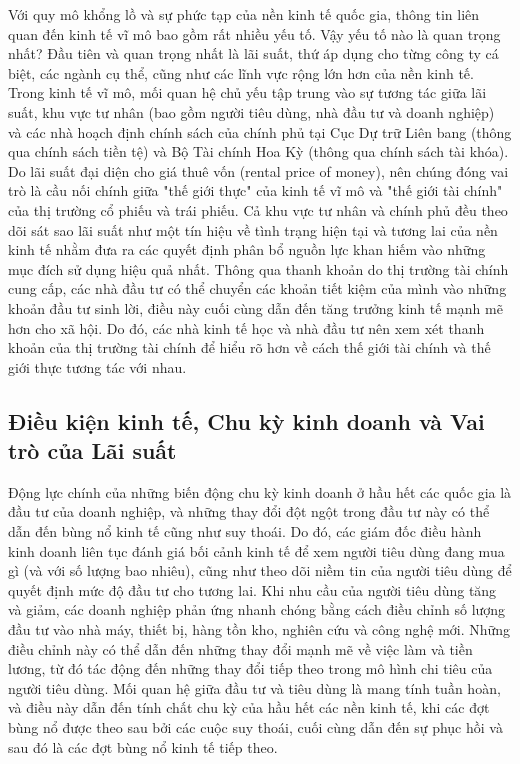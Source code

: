 Với quy mô khổng lồ và sự phức tạp của nền kinh tế quốc gia, thông tin liên quan đến kinh tế vĩ mô bao gồm rất nhiều yếu tố. Vậy yếu tố nào là quan trọng nhất? Đầu tiên và quan trọng nhất là lãi suất, thứ áp dụng cho từng công ty cá biệt, các ngành cụ thể, cũng như các lĩnh vực rộng lớn hơn của nền kinh tế. Trong kinh tế vĩ mô, mối quan hệ chủ yếu tập trung vào sự tương tác giữa lãi suất, khu vực tư nhân (bao gồm người tiêu dùng, nhà đầu tư và doanh nghiệp) và các nhà hoạch định chính sách của chính phủ tại Cục Dự trữ Liên bang (thông qua chính sách tiền tệ) và Bộ Tài chính Hoa Kỳ (thông qua chính sách tài khóa). Do lãi suất đại diện cho giá thuê vốn (rental price of money), nên chúng đóng vai trò là cầu nối chính giữa "thế giới thực" của kinh tế vĩ mô và "thế giới tài chính" của thị trường cổ phiếu và trái phiếu. Cả khu vực tư nhân và chính phủ đều theo dõi sát sao lãi suất như một tín hiệu về tình trạng hiện tại và tương lai của nền kinh tế nhằm đưa ra các quyết định phân bổ nguồn lực khan hiếm vào những mục đích sử dụng hiệu quả nhất. Thông qua thanh khoản do thị trường tài chính cung cấp, các nhà đầu tư có thể chuyển các khoản tiết kiệm của mình vào những khoản đầu tư sinh lời, điều này cuối cùng dẫn đến tăng trưởng kinh tế mạnh mẽ hơn cho xã hội. Do đó, các nhà kinh tế học và nhà đầu tư nên xem xét thanh khoản của thị trường tài chính để hiểu rõ hơn về cách thế giới tài chính và thế giới thực tương tác với nhau.

\subsection{Điều kiện kinh tế, Chu kỳ kinh doanh và Vai trò của Lãi suất}

Động lực chính của những biến động chu kỳ kinh doanh ở hầu hết các quốc gia là đầu tư của doanh nghiệp, và những thay đổi đột ngột trong đầu tư này có thể dẫn đến bùng nổ kinh tế cũng như suy thoái. Do đó, các giám đốc điều hành kinh doanh liên tục đánh giá bối cảnh kinh tế để xem người tiêu dùng đang mua gì (và với số lượng bao nhiêu), cũng như theo dõi niềm tin của người tiêu dùng để quyết định mức độ đầu tư cho tương lai. Khi nhu cầu của người tiêu dùng tăng và giảm, các doanh nghiệp phản ứng nhanh chóng bằng cách điều chỉnh số lượng đầu tư vào nhà máy, thiết bị, hàng tồn kho, nghiên cứu và công nghệ mới. Những điều chỉnh này có thể dẫn đến những thay đổi mạnh mẽ về việc làm và tiền lương, từ đó tác động đến những thay đổi tiếp theo trong mô hình chi tiêu của người tiêu dùng. Mối quan hệ giữa đầu tư và tiêu dùng là mang tính tuần hoàn, và điều này dẫn đến tính chất chu kỳ của hầu hết các nền kinh tế, khi các đợt bùng nổ được theo sau bởi các cuộc suy thoái, cuối cùng dẫn đến sự phục hồi và sau đó là các đợt bùng nổ kinh tế tiếp theo.

